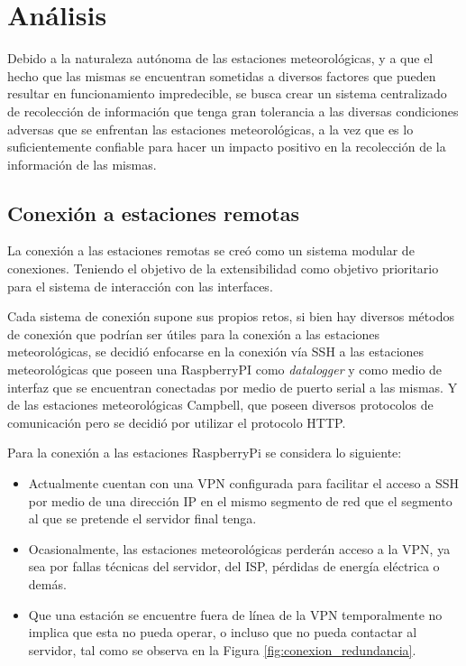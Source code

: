 
\section{Análisis}

Debido a la naturaleza autónoma de las estaciones meteorológicas, y a que el hecho que las mismas se encuentran sometidas a diversos factores que pueden resultar en funcionamiento impredecible, se busca crear un sistema centralizado de recolección de información que tenga gran tolerancia a las diversas condiciones adversas que se enfrentan las estaciones meteorológicas, a la vez que es lo suficientemente confiable para hacer un impacto positivo en la recolección de la información de las mismas.

\subsection{Conexión a estaciones remotas}


La conexión a las estaciones remotas se creó como un sistema modular de conexiones. Teniendo el objetivo de la extensibilidad como objetivo prioritario para el sistema de interacción con las interfaces.

Cada sistema de conexión supone sus propios retos, si bien hay diversos métodos de conexión que podrían ser útiles para la conexión a las estaciones meteorológicas, se decidió enfocarse en la conexión vía SSH a las estaciones meteorológicas que poseen una RaspberryPI como \textit{datalogger} y como medio de interfaz que se encuentran conectadas por medio de puerto serial a las mismas. Y de las estaciones meteorológicas Campbell, que poseen diversos protocolos de comunicación pero se decidió por utilizar el protocolo HTTP.

Para la conexión a las estaciones RaspberryPi se considera lo siguiente:

\begin{itemize}
   \item Actualmente cuentan con una VPN configurada para facilitar el acceso a SSH por medio de una dirección IP en el mismo segmento de red que el segmento al que se pretende el servidor final tenga.
   \item Ocasionalmente, las estaciones meteorológicas perderán acceso a la VPN, ya sea por fallas técnicas del servidor, del ISP, pérdidas de energía eléctrica o demás.
   \item Que una estación se encuentre fuera de línea de la VPN temporalmente no implica que esta no pueda operar, o incluso que no pueda contactar al servidor, tal como se observa en la Figura \ref{fig:conexion_redundancia}.
\end{itemize}

